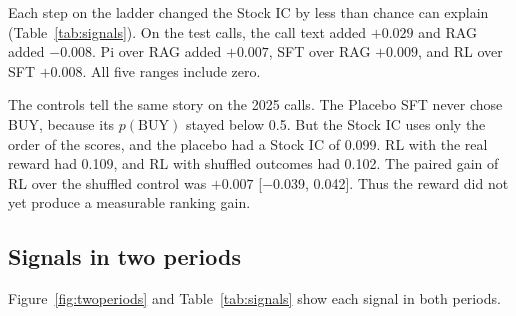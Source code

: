 \documentclass[sigconf,nonacm]{acmart}
\newcommand{\rng}[2]{{\scriptsize[#1, #2]}}
\begin{document}
Each step on the ladder changed the Stock IC by less than chance can explain (Table~\ref{tab:signals}).
On the test calls, the call text added $+0.029$ and RAG added $-0.008$.
Pi over RAG added $+0.007$, SFT over RAG $+0.009$, and RL over SFT $+0.008$.
All five ranges include zero.

The controls tell the same story on the 2025 calls.
The Placebo SFT never chose BUY, because its $p(\text{BUY})$ stayed below 0.5.
But the Stock IC uses only the order of the scores, and the placebo had a Stock IC of 0.099.
RL with the real reward had 0.109, and RL with shuffled outcomes had 0.102.
The paired gain of RL over the shuffled control was $+0.007$ \rng{$-$0.039}{0.042}.
Thus the reward did not yet produce a measurable ranking gain.

\subsection{Signals in two periods}\label{sec:signals}

Figure~\ref{fig:twoperiods} and Table~\ref{tab:signals} show each signal in both periods.
\end{document}
